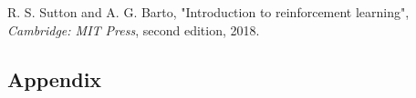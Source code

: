 \documentclass[letterpaper,12pt]{article}
\begin{document}
\begin{thebibliography}{99}
R. S. Sutton and A. G. Barto, "Introduction to reinforcement learning", \textit{Cambridge: MIT
Press}, second edition, 2018.
%
%
%
%
%
%
%
%
%
%
%
%
%
%

\end{thebibliography}

\begin{appendices}
\section{Appendix}
\end{appendices}
\end{document}

